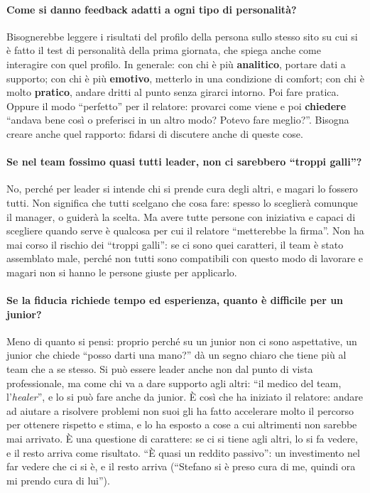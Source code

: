 \paragraph{Come si danno feedback adatti a ogni tipo di personalità?} Bisognerebbe leggere i risultati del
profilo della persona sullo stesso sito su cui si è fatto il test di personalità della prima giornata, che
spiega anche come interagire con quel profilo. In generale: con chi è più \textbf{analitico}, portare dati a
supporto; con chi è più \textbf{emotivo}, metterlo in una condizione di comfort; con chi è molto
\textbf{pratico}, andare dritti al punto senza girarci intorno. Poi fare pratica. Oppure il modo ``perfetto''
per il relatore: provarci come viene e poi \textbf{chiedere} ``andava bene così o preferisci in un altro modo?
Potevo fare meglio?''. Bisogna creare anche quel rapporto: fidarsi di discutere anche di queste cose.

\paragraph{Se nel team fossimo quasi tutti leader, non ci sarebbero ``troppi galli''?} No, perché per leader si
intende chi si prende cura degli altri, e magari lo fossero tutti. Non significa che tutti scelgano che cosa
fare: spesso lo sceglierà comunque il manager, o guiderà la scelta. Ma avere tutte persone con iniziativa e
capaci di scegliere quando serve è qualcosa per cui il relatore ``metterebbe la firma''. Non ha mai corso il
rischio dei ``troppi galli'': se ci sono quei caratteri, il team è stato assemblato male, perché non tutti sono
compatibili con questo modo di lavorare e magari non si hanno le persone giuste per applicarlo.

\paragraph{Se la fiducia richiede tempo ed esperienza, quanto è difficile per un junior?} Meno di quanto si
pensi: proprio perché su un junior non ci sono aspettative, un junior che chiede ``posso darti una mano?'' dà un
segno chiaro che tiene più al team che a se stesso. Si può essere leader anche non dal punto di vista
professionale, ma come chi va a dare supporto agli altri: ``il medico del team, l'\emph{healer}'', e lo si può
fare anche da junior. È così che ha iniziato il relatore: andare ad aiutare a risolvere problemi non suoi gli ha
fatto accelerare molto il percorso per ottenere rispetto e stima, e lo ha esposto a cose a cui altrimenti non
sarebbe mai arrivato. È una questione di carattere: se ci si tiene agli altri, lo si fa vedere, e il resto
arriva come risultato. ``È quasi un reddito passivo'': un investimento nel far vedere che ci si è, e il resto
arriva (``Stefano si è preso cura di me, quindi ora mi prendo cura di lui'').

